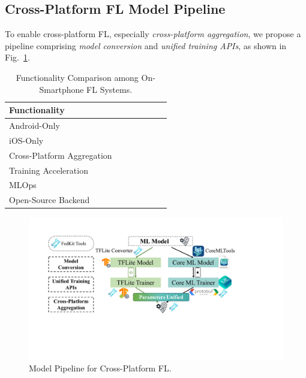 \documentclass[conference]{IEEEtran}
\begin{document}
\subsection{Cross-Platform FL Model Pipeline}
\label{sec:pipeline}

To enable cross-platform FL,
especially \textit{cross-platform aggregation},
we propose a pipeline comprising
\textit{model conversion} and
\textit{unified training APIs},
as shown in Fig.~\ref{cross_fl}.

\begin{table}
    \centering
    \newcommand{\Ys}{\ding{51}}
    \newcommand{\No}{\ding{55}}
\begin{tabular}{lcccccc}
Functionality               & \cite{he2020fedml}
                                    & \cite{madrigal2023project}
                                            & \cite{mathur2021ondevice}
                                                    & \cite{hall2021syft}
                                                            & \FedKit{}\\
\hline
Android-Only                & \Ys   & \Ys   & \Ys   & \Ys   & \Ys   \\
iOS-Only                    & \No   & \No   & \Ys   & \Ys   & \Ys   \\
Cross-Platform Aggregation  & \No   & \No   & \No   & \Ys   & \Ys   \\\hline
Training Acceleration       & \Ys   & \Ys   & \Ys   & \No   & \Ys   \\
MLOps                       & \Ys   & \Ys   & \No   & \No   & \Ys   \\
Open-Source Backend         & \No   & \No   & \Ys   & \Ys   & \Ys   \\
\end{tabular}
\caption{Functionality Comparison among On-Smartphone FL Systems.}
\label{tbl:fn-systems}
\end{table}

\begin{figure}
    \centering
    \includegraphics*[width=\linewidth]{model_pipeline.pdf}
    \caption{\FedKit{} Model Pipeline for Cross-Platform FL.}
    \label{cross_fl}
\end{figure}
\end{document}
